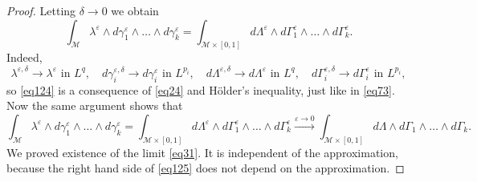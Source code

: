 \documentclass[intlimits,12pt,reqno]{amsart}
\newcommand{\cM}{\mathcal M}
\newcommand{\eps}{\varepsilon}
\numberwithin{equation}{section}
\theoremstyle{definition}
\begin{document}
\begin{proof}
Letting $\delta\to 0$ we obtain
\begin{equation}
\label{eq124}
\int_{\cM} \lambda^{\eps}\wedge d\gamma_1^\eps\wedge\ldots\wedge d\gamma^\eps_{k}
=
\int_{\cM\times [0,1]}d\Lambda^{\eps}\wedge d\Gamma_1^\eps\wedge\ldots\wedge d\Gamma_{k}^\eps.
\end{equation}
Indeed, 
$$
\lambda^{\eps,\delta}\to\lambda^\eps \text{ in } L^q,
\quad
d\gamma_i^{\eps,\delta}\to d\gamma_i^\eps \text{ in } L^{p_i},
\quad
d\Lambda^{\eps,\delta}\to d\Lambda^\eps \text{ in } L^q,
\quad
d\Gamma_i^{\eps,\delta}\to d\Gamma_i^\eps \text{ in } L^{p_i},
$$
so \eqref{eq124} is a consequence of \eqref{eq24} and H\"older's inequality, just like in \eqref{eq73}.
Now the same argument shows that
\begin{equation}
\label{eq125}
\int_{\cM} \lambda^{\eps}\wedge d\gamma_1^\eps\wedge\ldots\wedge d\gamma^\eps_{k}
=
\int_{\cM\times [0,1]}d\Lambda^{\eps}\wedge d\Gamma_1^\eps\wedge\ldots\wedge d\Gamma_{k}^\eps
\xrightarrow{\eps\to 0}
\int_{\cM\times [0,1]}d\Lambda \wedge d\Gamma_1 \wedge\ldots\wedge d\Gamma_{k}.
\end{equation}
We proved existence of the limit \eqref{eq31}. It is independent of the approximation, because the right hand side of \eqref{eq125} does not depend on the approximation.
\end{proof}
\end{document}
